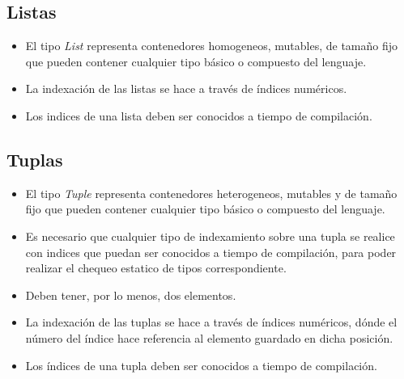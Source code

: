 \documentclass[12pt, spanish]{report}
\begin{document}
\subsection{Listas}
\label{sec:lists}
\begin{itemize}
\item El tipo \emph{List} representa contenedores homogeneos,
  mutables, de tama\~no fijo que pueden contener cualquier tipo
  b\'asico o compuesto del lenguaje.
\item La indexaci\'on de las listas se hace a trav\'es de \'indices
  num\'ericos.
\item Los indices de una lista deben ser conocidos a tiempo de
  compilaci\'on.
\end{itemize}

\subsection{Tuplas}
\label{sec:tuples}
\begin{itemize}
\item El tipo \emph{Tuple} representa contenedores heterogeneos,
  mutables y de tama\~no fijo que pueden contener cualquier tipo
  b\'asico o compuesto del lenguaje.
\item Es necesario que cualquier tipo de indexamiento sobre una tupla
  se realice con indices que puedan ser conocidos a tiempo de
  compilaci\'on, para poder realizar el chequeo estatico de tipos
  correspondiente.
\item Deben tener, por lo menos, dos elementos.
\item La indexaci\'on de las tuplas se hace a trav\'es de \'indices
  num\'ericos, d\'onde el n\'umero del \'indice hace referencia al elemento
  guardado en dicha posici\'on.
\item Los \'indices de una tupla deben ser conocidos a tiempo de
  compilaci\'on.
\end{itemize}
\end{document}
